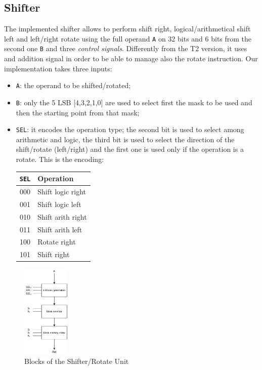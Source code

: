 \subsection{Shifter}
The implemented shifter allows to perform shift right, logical/arithmetical shift left and left/right rotate using the full operand \texttt{A} on 32 bits and 6 bits from the second one \texttt{B} and three \textit{control signals}.
Differently from the T2 version, it uses and addition signal in order to be able to manage also the rotate instruction. Our implementation takes three inputs:
\begin{itemize}
	\itemsep0sp
	\item \texttt{A}: the operand to be shifted/rotated;
	\item \texttt{B}: only the 5 LSB [4,3,2,1,0] are used to select first the mask to be used and then the starting point from that mask;
	\item \texttt{SEL}: it encodes the operation type; the second bit is used to select among arithmetic and logic, the third bit is used to select the direction of the shift/rotate (left/right) and the first one is used only if the operation is a rotate. This is the encoding:
	\begin{center}
		\begin{tabular}{c|l}
			\texttt{SEL} & \textbf{Operation}\\
			\hline
			000 & Shift logic right \\
			001 & Shift logic left \\
			010 & Shift arith right \\
			011 & Shift arith left \\
			100 & Rotate right \\
			101 & Shift right \\
		\end{tabular}
	\end{center}
\end{itemize}

\begin{figure}[ht]
	\centering
	\includegraphics[width=0.2\textwidth]{chapters/5_ExecuteStage/images/Shifter.pdf}
	\caption{Blocks of the Shifter/Rotate Unit}
	\label{fig:shifter}
\end{figure}

